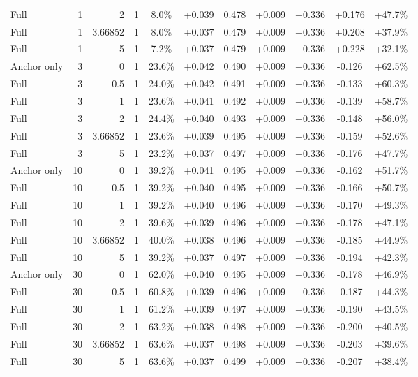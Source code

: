 \begin{table}[htbp]
\begin{tabular}{lrrrccccccc}
Full & 1 & 2 & 1 & 8.0\% & +0.039 & 0.478 & +0.009 & +0.336 & +0.176 & +47.7\% \\
Full & 1 & 3.66852 & 1 & 8.0\% & +0.037 & 0.479 & +0.009 & +0.336 & +0.208 & +37.9\% \\
Full & 1 & 5 & 1 & 7.2\% & +0.037 & 0.479 & +0.009 & +0.336 & +0.228 & +32.1\% \\
Anchor only & 3 & 0 & 1 & 23.6\% & +0.042 & 0.490 & +0.009 & +0.336 & -0.126 & +62.5\% \\
Full & 3 & 0.5 & 1 & 24.0\% & +0.042 & 0.491 & +0.009 & +0.336 & -0.133 & +60.3\% \\
Full & 3 & 1 & 1 & 23.6\% & +0.041 & 0.492 & +0.009 & +0.336 & -0.139 & +58.7\% \\
Full & 3 & 2 & 1 & 24.4\% & +0.040 & 0.493 & +0.009 & +0.336 & -0.148 & +56.0\% \\
Full & 3 & 3.66852 & 1 & 23.6\% & +0.039 & 0.495 & +0.009 & +0.336 & -0.159 & +52.6\% \\
Full & 3 & 5 & 1 & 23.2\% & +0.037 & 0.497 & +0.009 & +0.336 & -0.176 & +47.7\% \\
Anchor only & 10 & 0 & 1 & 39.2\% & +0.041 & 0.495 & +0.009 & +0.336 & -0.162 & +51.7\% \\
Full & 10 & 0.5 & 1 & 39.2\% & +0.040 & 0.495 & +0.009 & +0.336 & -0.166 & +50.7\% \\
Full & 10 & 1 & 1 & 39.2\% & +0.040 & 0.496 & +0.009 & +0.336 & -0.170 & +49.3\% \\
Full & 10 & 2 & 1 & 39.6\% & +0.039 & 0.496 & +0.009 & +0.336 & -0.178 & +47.1\% \\
Full & 10 & 3.66852 & 1 & 40.0\% & +0.038 & 0.496 & +0.009 & +0.336 & -0.185 & +44.9\% \\
Full & 10 & 5 & 1 & 39.2\% & +0.037 & 0.497 & +0.009 & +0.336 & -0.194 & +42.3\% \\
Anchor only & 30 & 0 & 1 & 62.0\% & +0.040 & 0.495 & +0.009 & +0.336 & -0.178 & +46.9\% \\
Full & 30 & 0.5 & 1 & 60.8\% & +0.039 & 0.496 & +0.009 & +0.336 & -0.187 & +44.3\% \\
Full & 30 & 1 & 1 & 61.2\% & +0.039 & 0.497 & +0.009 & +0.336 & -0.190 & +43.5\% \\
Full & 30 & 2 & 1 & 63.2\% & +0.038 & 0.498 & +0.009 & +0.336 & -0.200 & +40.5\% \\
Full & 30 & 3.66852 & 1 & 63.6\% & +0.037 & 0.498 & +0.009 & +0.336 & -0.203 & +39.6\% \\
Full & 30 & 5 & 1 & 63.6\% & +0.037 & 0.499 & +0.009 & +0.336 & -0.207 & +38.4\% \\

\end{tabular}
\end{table}
